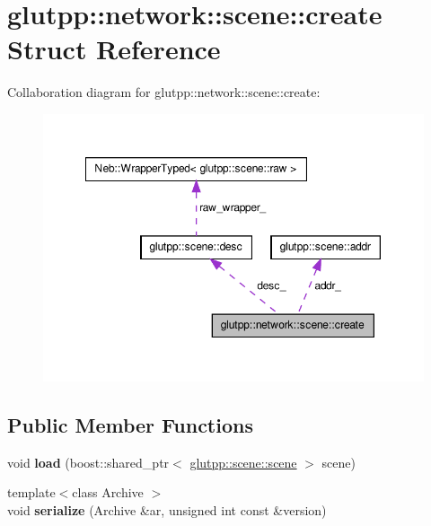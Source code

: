 \hypertarget{structglutpp_1_1network_1_1scene_1_1create}{\section{glutpp\-:\-:network\-:\-:scene\-:\-:create \-Struct \-Reference}
\label{structglutpp_1_1network_1_1scene_1_1create}
}


\-Collaboration diagram for glutpp\-:\-:network\-:\-:scene\-:\-:create\-:
\nopagebreak
\begin{figure}[H]
\begin{center}
\leavevmode
\includegraphics[width=350pt]{structglutpp_1_1network_1_1scene_1_1create__coll__graph}
\end{center}
\end{figure}
\subsection*{\-Public \-Member \-Functions}
\begin{DoxyCompactItemize}
\item 
\hypertarget{structglutpp_1_1network_1_1scene_1_1create_aa908a0cb6ab7b3ce7ec3d2db9017aa87}{void {\bfseries load} (boost\-::shared\-\_\-ptr$<$ \hyperlink{classglutpp_1_1scene_1_1scene}{glutpp\-::scene\-::scene} $>$ scene)}\label{structglutpp_1_1network_1_1scene_1_1create_aa908a0cb6ab7b3ce7ec3d2db9017aa87}

\item 
\hypertarget{structglutpp_1_1network_1_1scene_1_1create_a17f38bf631168fcfdd88f301917339c8}{{\footnotesize template$<$class Archive $>$ }\\void {\bfseries serialize} (\-Archive \&ar, unsigned int const \&version)}\label{structglutpp_1_1network_1_1scene_1_1create_a17f38bf631168fcfdd88f301917339c8}

\end{DoxyCompactItemize}
